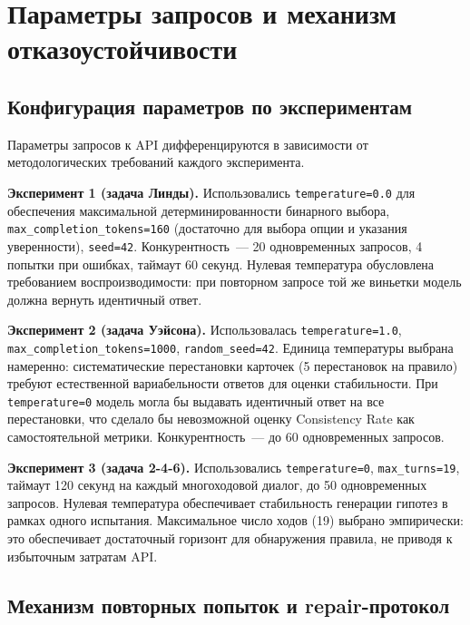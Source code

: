 \section{Параметры запросов и механизм отказоустойчивости}

\subsection{Конфигурация параметров по экспериментам}

Параметры запросов к API дифференцируются в зависимости от методологических требований каждого эксперимента.

\textbf{Эксперимент 1 (задача Линды).} Использовались \texttt{temperature=0.0} для обеспечения максимальной детерминированности бинарного выбора, \texttt{max\_completion\_tokens=160} (достаточно для выбора опции и указания уверенности), \texttt{seed=42}. Конкурентность~--- 20 одновременных запросов, 4 попытки при ошибках, таймаут 60 секунд. Нулевая температура обусловлена требованием воспроизводимости: при повторном запросе той же виньетки модель должна вернуть идентичный ответ.

\textbf{Эксперимент 2 (задача Уэйсона).} Использовалась \texttt{temperature=1.0}, \texttt{max\_completion\_tokens=1000}, \texttt{random\_seed=42}. Единица температуры выбрана намеренно: систематические перестановки карточек (5 перестановок на правило) требуют естественной вариабельности ответов для оценки стабильности. При \texttt{temperature=0} модель могла бы выдавать идентичный ответ на все перестановки, что сделало бы невозможной оценку Consistency Rate как самостоятельной метрики. Конкурентность~--- до 60 одновременных запросов.

\textbf{Эксперимент 3 (задача 2-4-6).} Использовались \texttt{temperature=0}, \texttt{max\_turns=19}, таймаут 120 секунд на каждый многоходовой диалог, до 50 одновременных запросов. Нулевая температура обеспечивает стабильность генерации гипотез в рамках одного испытания. Максимальное число ходов (19) выбрано эмпирически: это обеспечивает достаточный горизонт для обнаружения правила, не приводя к избыточным затратам API.

\subsection{Механизм повторных попыток и repair-протокол}

